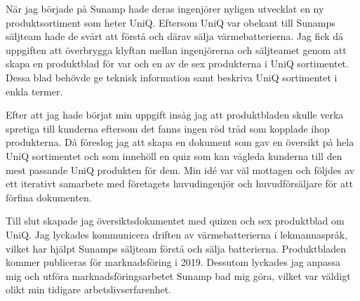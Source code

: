 \documentclass[11pt,a4paper,sans]{moderncv}        %
\begin{document}
N{\"a}r jag b{\"o}rjade p{\aa} Sunamp hade deras ingenj{\"o}rer nyligen utvecklat en ny produktsortiment som heter UniQ.
Eftersom UniQ var obekant till Sunamps s{\"a}ljteam hade de sv{\aa}rt att f{\"o}rst{\aa} och d{\"a}rav s{\"a}lja v{\"a}rmebatterierna.
Jag fick d{\aa} %
uppgiften att {\"o}verbrygga klyftan mellan ingenj{\"o}rerna och s{\"a}ljteamet
genom att skapa en produktblad f{\"o}r var och en av de sex produkterna i UniQ sortimentet.
Dessa blad beh{\"o}vde ge teknisk information samt beskriva UniQ sortimentet i enkla termer.

Efter att jag hade b{\"o}rjat min uppgift ins{\aa}g jag att produktbladen skulle verka spretiga till kunderna eftersom det fanns ingen r{\"o}d tr{\aa}d som kopplade ihop produkterna.
D{\aa} f{\"o}reslog jag att skapa en dokument som gav en {\"o}versikt p{\aa} hela UniQ sortimentet och som inneh{\"o}ll 
en quiz som kan v{\"a}gleda kunderna till den mest passande UniQ produkten f{\"o}r dem.
Min id{\'e} var v{\"a}l mottagen och f{\"o}ljdes av ett iterativt samarbete med f{\"o}retagets huvudingenj{\"o}r och huvudf{\"o}rs{\"a}ljare f{\"o}r att f{\"o}rfina dokumenten.

Till slut skapade jag {\"o}versiktsdokumentet med 
quizen och sex produktblad om UniQ.
Jag lyckades kommunicera driften av v{\"a}rmebatterierna i lekmannaspr{\aa}k, vilket har hj{\"a}lpt Sunamps s{\"a}ljteam f{\"o}rst{\aa} och s{\"a}lja batterierna.
Produktbladen kommer publiceras f{\"o}r marknadsf{\"o}ring i 2019.
Dessutom lyckades jag anpassa mig och utf{\"o}ra marknadsf{\"o}ringsarbetet Sunamp bad mig g{\"o}ra, vilket var v{\"a}ldigt olikt min tidigare arbetslivserfarenhet.

\end{document}
